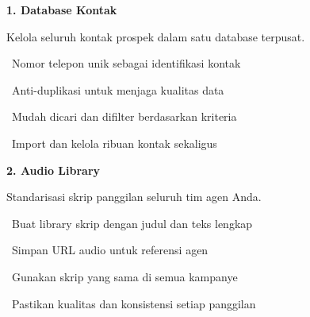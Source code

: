 \documentclass[a4paper]{article}
\begin{document}
\noindent
\begin{minipage}[t]{0.485\textwidth}
    \colorbox{CrimsonPrimary}{%
        \begin{minipage}{\dimexpr\textwidth-2\fboxsep\relax}
            {\fontsize{10}{13}\selectfont\bfseries\color{White} 1. Database Kontak}
        \end{minipage}}\par
    \vspace{4pt}
    {\fontsize{9}{12}\selectfont\color{TextDark}%
    Kelola seluruh kontak prospek dalam satu database terpusat.\par\vspace{3pt}
    \textbullet\ Nomor telepon unik sebagai identifikasi kontak\par\vspace{2pt}%
    \textbullet\ Anti-duplikasi untuk menjaga kualitas data\par\vspace{2pt}%
    \textbullet\ Mudah dicari dan difilter berdasarkan kriteria\par\vspace{2pt}%
    \textbullet\ Import dan kelola ribuan kontak sekaligus}%
\end{minipage}%
\hfill
\begin{minipage}[t]{0.485\textwidth}
    \colorbox{BluePrimary}{%
        \begin{minipage}{\dimexpr\textwidth-2\fboxsep\relax}
            {\fontsize{10}{13}\selectfont\bfseries\color{White} 2. Audio Library}
        \end{minipage}}\par
    \vspace{4pt}
    {\fontsize{9}{12}\selectfont\color{TextDark}%
    Standarisasi skrip panggilan seluruh tim agen Anda.\par\vspace{3pt}
    \textbullet\ Buat library skrip dengan judul dan teks lengkap\par\vspace{2pt}%
    \textbullet\ Simpan URL audio untuk referensi agen\par\vspace{2pt}%
    \textbullet\ Gunakan skrip yang sama di semua kampanye\par\vspace{2pt}%
    \textbullet\ Pastikan kualitas dan konsistensi setiap panggilan}%
\end{minipage}
\end{document}

